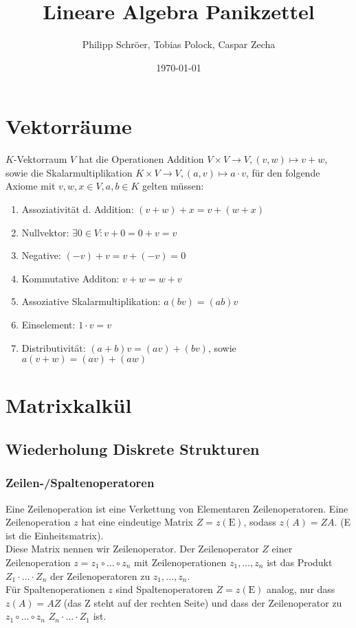 \documentclass[11pt]{scrartcl}
\title{\textbf{Lineare Algebra Panikzettel}}
\author{Philipp Schröer, Tobias Polock, Caspar Zecha}
\date{\today}
\begin{document}
\maketitle

\section{Vektorräume}

$K$-Vektorraum $V$ hat die Operationen Addition  $V \times V \to V, (v,w) \mapsto v+w$, sowie die Skalarmultiplikation $K \times V \to V, (a,v) \mapsto a \cdot v  $, für den folgende Axiome mit $v, w, x \in V, a,b \in K$ gelten müssen:

\begin{enumerate}
\item Assoziativität d. Addition: $(v+w)+x = v+(w+x)$
\item Nullvektor: $\exists 0 \in V: v+0=0+v=v$
\item Negative: $(-v)+v=v+(-v)=0$
\item Kommutative Additon: $v+w=w+v$
\item Assoziative Skalarmultiplikation: $a(bv)=(ab)v$
\item Einselement: $1\cdot v=v$
\item Distributivität: $(a+b)v=(av)+(bv)$, sowie $a(v+w)=(av)+(aw)$
\end{enumerate}

\section{Matrixkalkül}

\subsection{Wiederholung Diskrete Strukturen}

\subsubsection{Zeilen-/Spaltenoperatoren}

Eine Zeilenoperation ist eine Verkettung von Elementaren Zeilenoperatoren.
Eine Zeilenoperation $z$ hat eine eindeutige Matrix $Z = z(\mathrm{E})$, sodass $z(A) = ZA$. (E ist die Einheitsmatrix).	\\
Diese Matrix nennen wir Zeilenoperator. Der Zeilenoperator $Z$ einer Zeilenoperation $z = z_1 \circ \ldots \circ z_n$ mit Zeilenoperationen $z_1,\ldots,z_n$ ist das Produkt $Z_1 \cdot \ldots \cdot Z_n$ der Zeilenoperatoren zu $z_1,\ldots,z_n$.	\\
Für Spaltenoperationen $z$ sind Spaltenoperatoren $Z = z(\mathrm{E})$ analog, nur dass $z(A) = AZ$ (das Z steht auf der rechten Seite) und dass der Zeilenoperator zu $z_1 \circ \ldots \circ z_n$ $Z_n \cdot \ldots \cdot Z_1$ ist.
\end{document}
